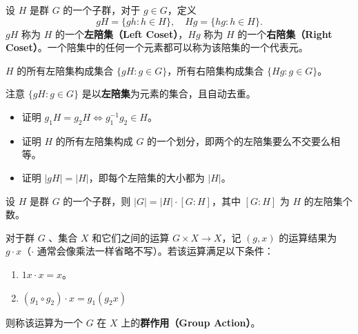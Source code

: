\begin{example}
\end{example}

\begin{definition}[陪集]
    设 $H$ 是群 $G$ 的一个子群，对于 $g \in G$，定义
    $$
    gH=\{gh:h\in H\},\quad Hg=\{hg:h\in H\}.
    $$
    $gH$ 称为 $H$ 的一个\textbf{左陪集（Left Coset）}，$Hg$ 称为 $H$ 的一个\textbf{右陪集（Right Coset）}。一个陪集中的任何一个元素都可以称为该陪集的一个代表元。

    $H$ 的所有左陪集构成集合 $\{gH : g \in G\}$，所有右陪集构成集合 $\{Hg:g\in G\}$。
\end{definition}
\begin{remark}
    注意 $\{gH:g\in G\}$ 是以\textbf{左陪集}为元素的集合，且自动去重。
\end{remark}
\begin{exercise}
    \begin{itemize}
        \item 证明 $g_1H=g_2H\iff g_1^{-1}g_2\in H$。
        \item 证明 $H$ 的所有左陪集构成 $G$ 的一个划分，即两个的左陪集要么不交要么相等。
        \item 证明 $|gH|=|H|$，即每个左陪集的大小都为 $|H|$。
    \end{itemize}
\end{exercise}

\begin{theorem}[Lagrange 定理]
    设 $H$ 是群 $G$ 的一个子群，则 $|G|=|H|\cdot [G:H]$，其中 $[G:H]$ 为 $H$ 的左陪集个数。
\end{theorem}

\begin{definition}[群作用]
    对于群 $G$ 、集合 $X$ 和它们之间的运算 $G \times X \to X$，记 $(g,x)$ 的运算结果为 $g\cdot x$（$\cdot$ 通常会像乘法一样省略不写）。若该运算满足以下条件：
    \begin{enumerate}
        \item $1x \cdot x = x$。
        \item $(g_1 \circ g_2) \cdot x = g_1 (g_2 x)$
    \end{enumerate}
    则称该运算为一个 $G$ 在 $X$ 上的\textbf{群作用（Group Action）}。
\end{definition}

